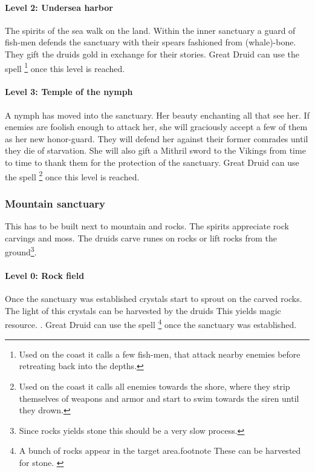 \paragraph{Level 2: Undersea harbor}
The spirits of the sea walk on the land. Within the inner sanctuary a guard of
fish-men defends the sanctuary with their spears fashioned from (whale)-bone.
They gift the druids gold in exchange for their stories. Great Druid can use
the spell \footnote{ Used on the coast it calls a few
	fish-men, that attack nearby enemies before retreating back into the depths. }
once this level is reached.

\paragraph{Level 3: Temple of the nymph}
A nymph has moved into the sanctuary. Her beauty enchanting all that see her.
If enemies are foolish enough to attack her, she will graciously accept a few
of them as her new honor-guard. They will defend her against their former
comrades until they die of starvation. She will also gift a Mithril sword to
the \gls*{Vikings} from time to time to thank them for the protection of the
sanctuary. Great Druid can use the spell \footnote{ Used
	on the coast it calls all enemies towards the shore, where they strip
	themselves of weapons and armor and start to swim towards the siren until they
	drown. } once this level is reached.

\subsubsection{Mountain sanctuary}\label{ch:Tribes:Vikings:Religion:Mountain}
This has to be built next to mountain and rocks. The spirits appreciate rock
carvings and moss. The druids carve runes on rocks or lift rocks from the
ground\footnote{ Since rocks yields stone this should be a very slow process.
}.

\paragraph{Level 0: Rock field}
Once the sanctuary was established crystals start to sprout on the carved
rocks. The light of this crystals can be harvested by the druids{ This yields
		magic resource. }. Great Druid can use the spell \footnote{ A bunch of rocks appear in the target area.footnote{ These can
			be harvested for stone. } } once the sanctuary was established.

